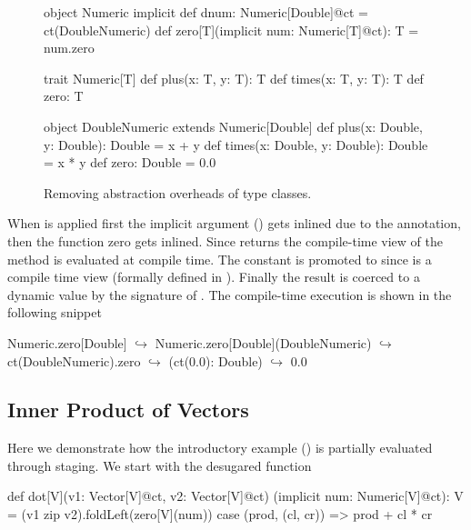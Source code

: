 \begin{figure}
\begin{listing}
object Numeric {
  implicit def dnum: Numeric[Double]@ct =
    ct(DoubleNumeric)
  def zero[T](implicit num: Numeric[T]@ct): T =
    num.zero
}

trait Numeric[T] {
  def plus(x: T, y: T): T
  def times(x: T, y: T): T
  def zero: T
}

object DoubleNumeric extends Numeric[Double] {
  def plus(x: Double, y: Double): Double = x + y
  def times(x: Double, y: Double): Double = x * y
  def zero: Double = 0.0
}
\end{listing}
\caption{\label{fig:numeric} Removing abstraction overheads of type classes.}
\end{figure}

When  is applied first the implicit argument () gets
inlined due to the  annotation, then the function zero gets
inlined. Since  returns the compile-time view of 
the method  is evaluated at compile time. The constant  is
promoted to  since  is a compile time view
(formally defined in ). Finally the  result
is coerced to a dynamic value by the signature of . The
compile-time execution is shown in the following snippet

\begin{lstparagraph}
Numeric.zero[Double]
  $\hookrightarrow$ Numeric.zero[Double](DoubleNumeric)
  $\hookrightarrow$ ct(DoubleNumeric).zero
  $\hookrightarrow$ (ct(0.0): Double)
  $\hookrightarrow$ 0.0
\end{lstparagraph}

\subsection{Inner Product of Vectors}
\label{sct:dot-product}

Here we demonstrate how the introductory example () is
partially evaluated through staging. We start with the desugared  function

\begin{lstparagraph}
def dot[V](v1: Vector[V]@ct, v2: Vector[V]@ct)
  (implicit num: Numeric[V]@ct): V =
  (v1 zip v2).foldLeft(zero[V](num)) {
    case (prod, (cl, cr)) => prod + cl * cr
  }
\end{lstparagraph}


